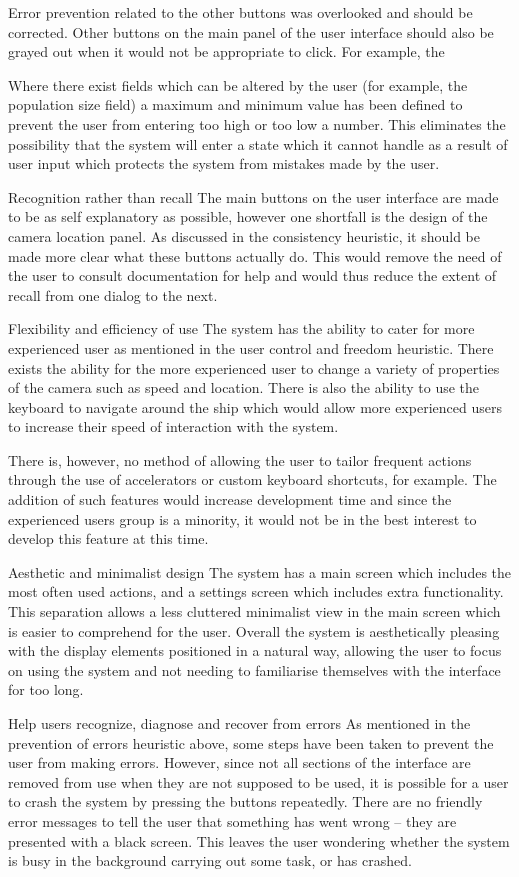 \documentclass{article}
\begin{document}
Error prevention related to the other buttons was overlooked and should be corrected. Other buttons on the main panel of the user interface should also be grayed out when it would not be appropriate to click. For example, the

Where there exist fields which can be altered by the user (for example, the population size field) a maximum and minimum value has been defined to prevent the user from entering too high or too low a number. This eliminates the possibility that the system will enter a state which it cannot handle as a result of user input which protects the system from mistakes made by the user.

Recognition rather than recall
The main buttons on the user interface are made to be as self explanatory as possible, however one shortfall is the design of the camera location panel. As discussed in the consistency heuristic, it should be made more clear what these buttons actually do. This would remove the need of the user to consult documentation for help and would thus reduce the extent of recall from one dialog to the next.

Flexibility and efficiency of use
The system has the ability to cater for more experienced user as mentioned in the user control and freedom heuristic. There exists the ability for the more experienced user to change a variety of properties of the camera such as speed and location. There is also the ability to use the keyboard to navigate around the ship which would allow more experienced users to increase their speed of interaction with the system.

There is, however, no method of allowing the user to tailor frequent actions through the use of accelerators or custom keyboard shortcuts, for example. The addition of such features would increase development time and since the experienced users group is a minority, it would not be in the best interest to develop this feature at this time.

Aesthetic and minimalist design
The system has a main screen which includes the most often used actions, and a settings screen which includes extra functionality. This separation allows a less cluttered minimalist view in the main screen which is easier to comprehend for the user. Overall the system is aesthetically pleasing with the display elements positioned in a natural way, allowing the user to focus on using the system and not needing to familiarise themselves with the interface for too long.   

Help users recognize, diagnose and recover from errors
As mentioned in the prevention of errors heuristic above, some steps have been taken to prevent the user from making errors. However, since not all sections of the interface are removed from use when they are not supposed to be used, it is possible for a user to crash the system by pressing the buttons repeatedly. There are no friendly error messages to tell the user that something has went wrong -- they are presented with a black screen. This leaves the user wondering whether the system is busy in the background carrying out some task, or has crashed.
\end{document}
